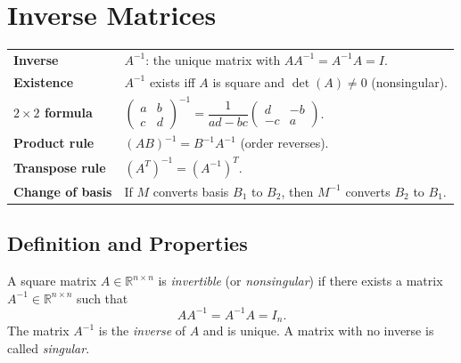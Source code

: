 
\section{Inverse Matrices}

\begin{tcolorbox}[colback=gray!6, colframe=gray!40, arc=2pt,
  left=6pt, right=6pt, top=4pt, bottom=4pt,
  title={\small\textbf{Inverse Matrices --- Quick Reference}},
  fonttitle=\small\bfseries]
\begin{tabular}{@{}p{}p{}@{}}
\textbf{Inverse}          & $A^{-1}$: the unique matrix with $AA^{-1} = A^{-1}A = I$. \\[4pt]
\textbf{Existence}        & $A^{-1}$ exists iff $A$ is square and $\det(A) \neq 0$ (nonsingular). \\[4pt]
\textbf{$2\times 2$ formula} & $\begin{pmatrix} a & b \\ c & d \end{pmatrix}^{-1} = \dfrac{1}{ad-bc}\begin{pmatrix} d & -b \\ -c & a \end{pmatrix}$. \\[8pt]
\textbf{Product rule}     & $(AB)^{-1} = B^{-1}A^{-1}$ (order reverses). \\[4pt]
\textbf{Transpose rule}   & $(A^T)^{-1} = (A^{-1})^T$. \\[4pt]
\textbf{Change of basis}  & If $M$ converts basis $B_1$ to $B_2$, then $M^{-1}$ converts $B_2$ to $B_1$. \\
\end{tabular}
\end{tcolorbox}

\subsection{Definition and Properties}

\begin{tcolorbox}[colback=propbox, colframe=propborder, arc=2pt,
  left=6pt, right=6pt, top=4pt, bottom=4pt,
  title={\small\textbf{Definition (Invertible Matrix)}},
  fonttitle=\small\bfseries]
A square matrix $A \in \mathbb{R}^{n \times n}$ is \emph{invertible}
(or \emph{nonsingular}) if there exists a matrix $A^{-1} \in \mathbb{R}^{n \times n}$
such that
\[
  AA^{-1} = A^{-1}A = I_n.
\]
The matrix $A^{-1}$ is the \emph{inverse} of $A$ and is unique.
A matrix with no inverse is called \emph{singular}.
\end{tcolorbox}

